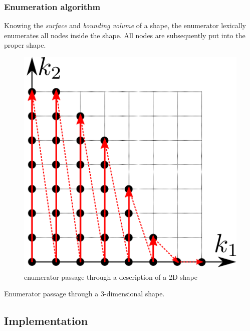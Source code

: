 \documentclass{article}
\begin{document}
\begin{figure}[htbp]
  \centering


\end{figure}

\subsubsection{Enumeration algorithm}
Knowing the \emph{surface} and \emph{bounding volume} of a shape, the
enumerator lexically enumerates all nodes inside the shape. All nodes
are subsequently put into the proper shape.

\begin{figure}[H]
  \centering
  \includegraphics[]{shape_enumerator}
  \caption{enumerator passage through a description of a 2D-shape}
  \label{fig:shape_example}
\end{figure}

\begin{algorithm}[H]
  \caption{Enumerator passage through a 3-dimensional shape.}
\end{algorithm}

\subsection{Implementation}
\end{document}
